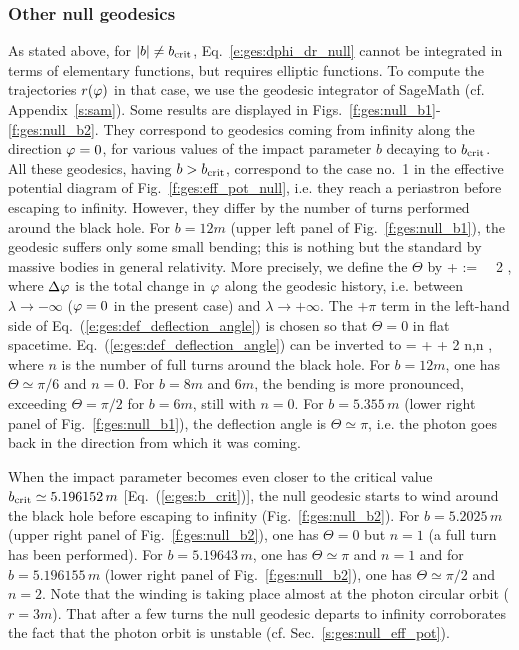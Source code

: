 \subsubsection{Other null geodesics}

As stated above, for $|b| \not= b_{\rm crit}$, Eq.~\eqref{e:ges:dphi_dr_null} cannot be integrated
in terms of elementary functions, but requires elliptic functions.
To compute the trajectories $r(\varphi)$ in that case, we use the geodesic integrator
of SageMath (cf. Appendix~\ref{s:sam}). Some results are displayed in
Figs.~\ref{f:ges:null_b1}-\ref{f:ges:null_b2}. They correspond to
geodesics coming from infinity along the
direction $\varphi=0$, for various values of the
impact parameter $b$ decaying to $b_{\rm crit}$. All these geodesics, having
$b > b_{\rm crit}$, correspond to the case no.~1 in the effective potential
diagram of Fig.~\ref{f:ges:eff_pot_null}, i.e. they reach a periastron
before escaping to infinity. However, they differ by the number of turns
performed around the black hole. For $b=12 m$ (upper left panel of Fig.~\ref{f:ges:null_b1}),
the geodesic suffers only some small bending; this is nothing but the standard
 by massive bodies in
general relativity. More precisely, we define the 
$\Theta$ by
\be \label{e:ges:def_deflection_angle}
    \Theta + \pi := \Delta\ph \ \ 2 \pi,
\ee
where $\Delta\varphi$ is the total change in $\varphi$ along the geodesic history, i.e.
between $\lambda\to -\infty$ ($\varphi=0$ in the present case) and $\lambda\to +\infty$.
The $+\pi$ term in the left-hand side of Eq.~(\ref{e:ges:def_deflection_angle}) is chosen so
that $\Theta = 0$ in flat spacetime. Eq.~(\ref{e:ges:def_deflection_angle}) can be
inverted to
\be \label{e:ges:Dph_Theta_n}
    \Delta\ph = \Theta + \pi + 2 \pi n,\qquad n\in {} ,
\ee
where $n$ is the number of full turns around the black hole.
For $b = 12 m$, one has $\Theta\simeq \pi/6$ and $n=0$.
For $b=8 m$ and $6 m$, the bending is more pronounced,
exceeding $\Theta = \pi/2$ for $b=6 m$, still with $n=0$. For $b=5.355\, m$ (lower right panel of Fig.~\ref{f:ges:null_b1}), the deflection angle is $\Theta\simeq\pi$, i.e. the photon goes back in the direction
from which it was coming.

When the impact parameter becomes even closer to the critical value
$b_{\rm crit}\simeq 5.196152\, m$ [Eq.~(\ref{e:ges:b_crit})],
the null geodesic starts to wind around the black hole before escaping
to infinity (Fig.~\ref{f:ges:null_b2}).
For $b=5.2025\, m$ (upper right panel of Fig.~\ref{f:ges:null_b2}), one has $\Theta=0$
but $n=1$ (a full turn has been performed). For $b=5.19643\, m$, one has
$\Theta\simeq\pi$ and $n=1$ and for $b=5.196155\, m$ (lower right panel of Fig.~\ref{f:ges:null_b2}), one has
$\Theta\simeq \pi/2$ and $n=2$.
Note that the winding is taking place
almost at the photon circular orbit ($r=3m$). That after a few turns the null geodesic
departs to infinity corroborates the fact that the photon orbit is unstable
(cf. Sec.~\ref{s:ges:null_eff_pot}).

